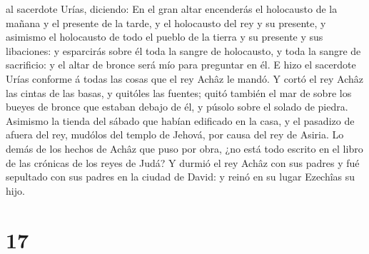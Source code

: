 al sacerdote Urías, diciendo: En el gran altar encenderás el holocausto
de la mañana y el presente de la tarde, y el holocausto del rey y su
presente, y asimismo el holocausto de todo el pueblo de la tierra y su
presente y sus libaciones: y esparcirás sobre él toda la sangre de
holocausto, y toda la sangre de sacrificio: y el altar de bronce será
mío para preguntar en él.  E hizo el sacerdote Urías
conforme á todas las cosas que el rey Achâz le mandó.  Y
cortó el rey Achâz las cintas de las basas, y quitóles las fuentes;
quitó también el mar de sobre los bueyes de bronce que estaban debajo de
él, y púsolo sobre el solado de piedra.  Asimismo la
tienda del sábado que habían edificado en la casa, y el pasadizo de
afuera del rey, mudólos del templo de Jehová, por causa del rey de
Asiria.  Lo demás de los hechos de Achâz que puso por
obra, ¿no está todo escrito en el libro de las crónicas de los reyes de
Judá?  Y durmió el rey Achâz con sus padres y fué
sepultado con sus padres en la ciudad de David: y reinó en su lugar
Ezechîas su hijo.

\hypertarget{section-16}{%
\section{17}\label{section-16}}

